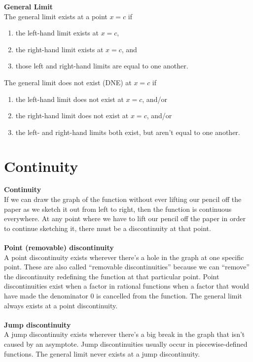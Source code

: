 \noindent \textbf{General Limit}\\
The general limit exists at a point $x=c$ if
\begin{enumerate}
  \item the left-hand limit exists at $x=c$,
  \item the right-hand limit exists at $x=c$, and
  \item those left and right-hand limits are equal to one another.\\
\end{enumerate}

\noindent The general limit does not exist (DNE) at $x = c$ if
\begin{enumerate}
  \item the left-hand limit does not exist at $x=c$, and/or
  \item the right-hand limit does not exist at $x=c$, and/or
  \item the left- and right-hand limits both exist, but aren't equal to one 
        another.
\end{enumerate}


\section{Continuity}
\noindent \textbf{Continuity}\\
If we can draw the graph of the function without ever lifting our pencil off the
paper as we sketch it out from left to right, then the function is continuous 
everywhere. At any point where we have to lift our pencil off the paper in order
to continue sketching it, there must be a discontinuity at that point.\\\\

\noindent \textbf{Point (removable) discontinuity}\\
A point discontinuity exists wherever there's a hole in the graph at one 
specific point. These are also called “removable discontinuities” because we can
“remove” the discontinuity redefining the function at that particular point. 
Point discontinuities exist when a factor in rational functions when a factor 
that would have made the denominator 0 is cancelled from the function. The 
general limit always exists at a point discontinuity.\\\\

\noindent \textbf{Jump discontinuity}\\
A jump discontinuity exists wherever there's a big break in the graph that isn't 
caused by an asymptote. Jump discontinuities usually occur in piecewise-defined 
functions. The general limit never exists at a jump discontinuity.\\\\

